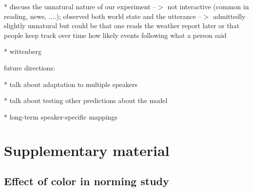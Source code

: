 \documentclass[lucida,biblatex]{sp} %
\begin{document}
	*  discuss the unnatural nature of our experiment --$>$ not interactive (common in reading, news, ....); observed both world state
	     and the utterance --$>$ admittedly slightly unnatural but could be that one reads the weather report later or that people keep track
	     over time how likely events following what a person said
	     
       * wittenberg


future directions:

* talk about adaptation to multiple speakers

* talk about testing other predictions about the model

* long-term speaker-specific mappings
	

\printbibliography
%






\section*{Supplementary material}

\subsection*{Effect of color in norming study}
\end{document}
